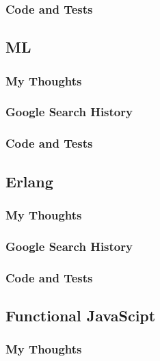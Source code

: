 \documentclass[letterpaper, 10pt, DIV=13]{scrartcl}
\numberwithin{equation}{section}
\numberwithin{figure}{section}
\numberwithin{table}{section}
\begin{document}
\subsubsection{Code and Tests}



\subsection{ML}
\subsubsection{My Thoughts}

\subsubsection{Google Search History}

\subsubsection{Code and Tests}

\subsection{Erlang}
\subsubsection{My Thoughts}

\subsubsection{Google Search History}

\subsubsection{Code and Tests}

\subsection{Functional JavaScipt}
\subsubsection{My Thoughts}
\end{document}
